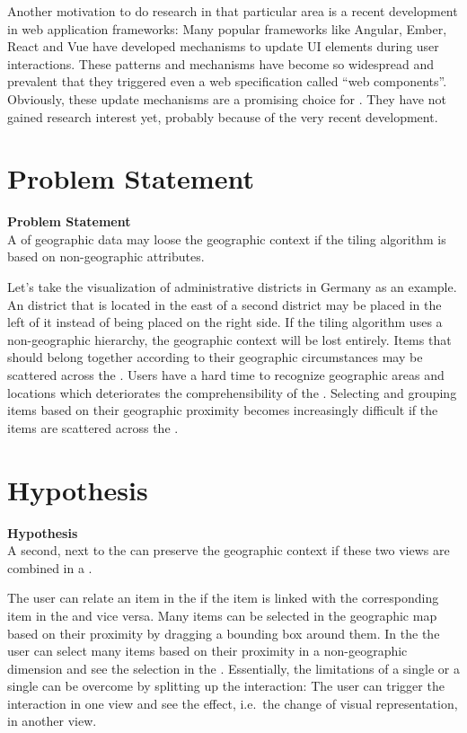 Another motivation to do research in that particular area is a recent development in web application frameworks:
Many popular frameworks like Angular, Ember, React and Vue have developed mechanisms to update UI elements during user interactions.
These patterns and mechanisms have become so widespread and prevalent that they triggered even a web specification called ``web components''.
Obviously, these update mechanisms are a promising choice for \cmvs{}.
They have not gained research interest yet, probably because of the very recent development.

\section{Problem Statement}
\begin{tcolorbox}
\textbf{Problem Statement} \\
A \tmap{} of geographic data may loose the geographic context if the tiling algorithm is based on non-geographic attributes.
\end{tcolorbox}

Let's take the visualization of administrative districts in Germany as an example.
An  district that is located in the east of a second district may be placed in the \tmap{} left of it instead of being placed on the right side.
If the tiling algorithm uses a non-geographic hierarchy, the geographic context will be lost entirely.
Items that should belong together according to their geographic circumstances may be scattered across the \tmap{}.
Users have a hard time to recognize geographic areas and locations which deteriorates the comprehensibility of the \tmap{}.
Selecting and grouping items based on their geographic proximity becomes increasingly difficult if the items are scattered across the \tmap{}.


\section{Hypothesis}\label{sec:introduction:hypothesis}

\begin{tcolorbox}
\textbf{Hypothesis} \\
A second, \gv{} next to the \tmap{} can preserve the geographic context if these two views are combined in a \cmv{}.
\end{tcolorbox}

The user can relate an item in the \tmap{} if the item is linked with the corresponding item in the \gv{} and vice versa.
Many items can be selected in the geographic map based on their proximity by dragging a bounding box around them.
In the \tmap{} the user can select many items based on their proximity in a non-geographic dimension and see the selection in the \gv{}.
Essentially,  the limitations of a single \tmap{} or a single \gv{} can be overcome by splitting up the interaction:
The user can trigger the interaction in one view and see the effect, i.e.\ the change of visual representation, in another view.


